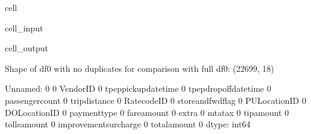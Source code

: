 \documentclass[letterpaper,10pt,english]{sphinxmanual}
\begin{document}
\begin{sphinxuseclass}{cell}
\begin{sphinxuseclass}{cell_input}
\begin{sphinxVerbatim}[commandchars=\\\{\}]
  
\end{sphinxVerbatim}

\end{sphinxuseclass}
\begin{sphinxuseclass}{cell_output}
\begin{sphinxVerbatim}[commandchars=\\\{\}]
Shape of df0 with no duplicates for comparison with full df0: (22699, 18)

Unnamed: 0               0
VendorID                 0
tpep\PYGZus{}pickup\PYGZus{}datetime     0
tpep\PYGZus{}dropoff\PYGZus{}datetime    0
passenger\PYGZus{}count          0
trip\PYGZus{}distance            0
RatecodeID               0
store\PYGZus{}and\PYGZus{}fwd\PYGZus{}flag       0
PULocationID             0
DOLocationID             0
payment\PYGZus{}type             0
fare\PYGZus{}amount              0
extra                    0
mta\PYGZus{}tax                  0
tip\PYGZus{}amount               0
tolls\PYGZus{}amount             0
improvement\PYGZus{}surcharge    0
total\PYGZus{}amount             0
dtype: int64
\end{sphinxVerbatim}

\end{sphinxuseclass}
\end{sphinxuseclass}
\end{document}
